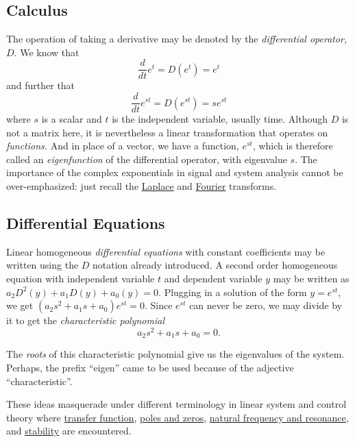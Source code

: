 \documentclass[
  11pt,
  british,
  a4paper,
]{article}
\begin{document}
\hypertarget{calculus}{%
\subsection{Calculus}\label{calculus}}

The operation of taking a derivative may be denoted by the
\emph{differential operator,} \(D\). We know that \[
\frac{d}{dt}e^{t} = D(e^{t}) = e^{t}
\] and further that \[
\frac{d}{dt}e^{st} = D(e^{st}) = se^{st}
\] where \(s\) is a scalar and \(t\) is the independent variable,
usually time. Although \(D\) is not a matrix here, it is nevertheless a
linear transformation that operates on \emph{functions.} And in place of
a vector, we have a function, \(e^{st}\), which is therefore called an
\emph{eigenfunction} of the differential operator, with eigenvalue
\(s\). The importance of the complex exponentials in signal and system
analysis cannot be over-emphasized: just recall the
\href{https://en.wikipedia.org/wiki/Laplace_transform}{Laplace} and
\href{https://en.wikipedia.org/wiki/Fourier_transform}{Fourier}
transforms.

\hypertarget{differential-equations}{%
\subsection{Differential Equations}\label{differential-equations}}

Linear homogeneous \emph{differential equations} with constant
coefficients may be written using the \(D\) notation already introduced.
A second order homogeneous equation with independent variable \(t\) and
dependent variable \(y\) may be written as
\(a_2D^2(y) + a_1D(y) + a_0(y) = 0\). Plugging in a solution of the form
\(y = e^{st}\), we get \((a_2s^2 + a_1s + a_0)e^{st} = 0.\) Since
\(e^{st}\) can never be zero, we may divide by it to get the
\emph{characteristic polynomial} \begin{equation}
a_2s^2 + a_1s + a_0 = 0.
\label{eq:cp}\end{equation}

The \emph{roots} of this characteristic polynomial give us the
eigenvalues of the system. Perhaps, the prefix ``eigen'' came to be used
because of the adjective ``characteristic''.

These ideas masquerade under different terminology in linear system and
control theory where
\href{https://en.wikipedia.org/wiki/Transfer_function}{transfer
function},
\href{http://web.mit.edu/2.14/www/Handouts/PoleZero.pdf}{poles and
zeros}, \href{https://www.youtube.com/watch?v=hcXbyS2Cf2o}{natural
frequency and resonance}, and
\href{https://en.wikibooks.org/wiki/Control_Systems/Stability}{stability}
are encountered.
\end{document}
